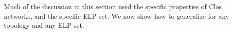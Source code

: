 
Much of the discussion in this section used the specific properties of Clos
networks, and the specific ELP set. We now show how to generalize \sysname{} for
any topology and any ELP set.

